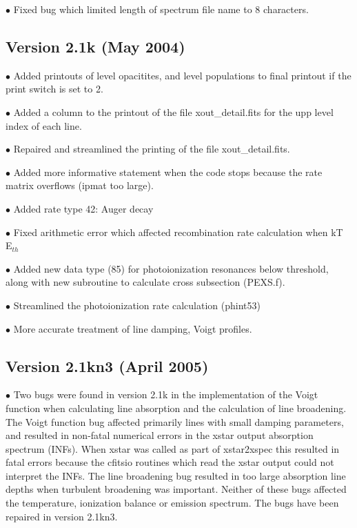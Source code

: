 $\bullet$ Fixed bug which limited length of spectrum file name to 8 characters.

\subsection{Version 2.1k (May 2004)}

$\bullet$  Added printouts of level opacitites, and level populations to 
final printout if the print switch is set to 2.

$\bullet$  Added a column to the printout of the file xout\_detail.fits 
for the upp level index of each line.

$\bullet$  Repaired and streamlined the printing of the file xout\_detail.fits.

$\bullet$  Added more informative statement when the code stops because
the rate matrix overflows (ipmat too large).

$\bullet$  Added rate type 42: Auger decay

$\bullet$  Fixed arithmetic error which affected recombination rate calculation 
when kT $\>\>$ E$_{th}$

$\bullet$  Added new data type (85) for photoionization resonances below threshold,
along with new subroutine to calculate cross subsection (PEXS.f).

$\bullet$  Streamlined the photoionization rate calculation (phint53)

$\bullet$  More accurate treatment of line damping, Voigt profiles.

\subsection{Version 2.1kn3 (April 2005)}

$\bullet$ Two bugs were found in version 2.1k in the implementation of the Voigt function 
when calculating line absorption and the calculation of line broadening. 
The Voigt function bug affected primarily lines with small damping parameters, 
and resulted in non-fatal numerical errors in the xstar output absorption spectrum (INFs). 
When xstar was called as part of xstar2xspec this resulted in fatal errors 
because the cfitsio routines which read the xstar output could not interpret the INFs. 
The line broadening bug resulted in too large absorption line depths when turbulent 
broadening was important. Neither of these bugs affected the temperature, 
ionization balance or emission spectrum. The bugs have been repaired in version 2.1kn3. 

